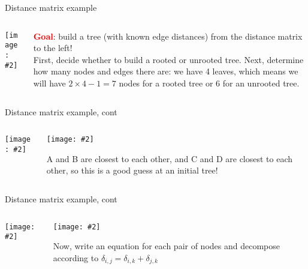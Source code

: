 \documentclass{beamer}
\renewcommand{\c}[1]{\begin{center}#1\end{center}}
\newcommand{\red}[1]{\textcolor{red}{\textbf{#1}}}
\newcommand{\gr}[2][.95]{\c{\texttt{[image: \#2]}}}
\begin{document}
\begin{frame}{Distance matrix example}
    \begin{columns}
        \begin{column}{0.5\textwidth}
            \gr[0.8]{l5_figs/s19_dist_matrix.png}
        \end{column}
        \begin{column}{0.5\textwidth}
            \red{Goal}: build a tree (with known edge distances) from the distance matrix to the left!\\
            \bigskip
            First, decide whether to build a rooted or unrooted tree. Next, determine how many nodes and edges there are: we have 4 leaves, which means we will have $2 \times 4 - 1 = 7$ nodes for a rooted tree or 6 for an unrooted tree.
        \end{column}
    \end{columns}
\end{frame}

\begin{frame}{Distance matrix example, cont}
    \begin{columns}
        \begin{column}{0.5\textwidth}
            \gr[0.8]{l5_figs/s19_dist_matrix.png}
        \end{column}
        \begin{column}{0.5\textwidth}
            \gr{l5_figs/s20_tree1.png}
            \footnotesize A and B are closest to each other, and C and D are closest to each other, so this is a good guess at an initial tree!
        \end{column}
    \end{columns}
\end{frame}

\begin{frame}{Distance matrix example, cont}
    \begin{columns}
        \begin{column}{0.5\textwidth}
            \gr[0.8]{l5_figs/s19_dist_matrix.png}
        \end{column}
        \begin{column}{0.5\textwidth}
            \gr[0.8]{l5_figs/s21_tree2.png}
            \footnotesize Now, write an equation for each pair of nodes and decompose according to $\delta_{i,j} = \delta_{i,k} + \delta_{j,k}$
        \end{column}
    \end{columns}
\end{frame}
\end{document}
